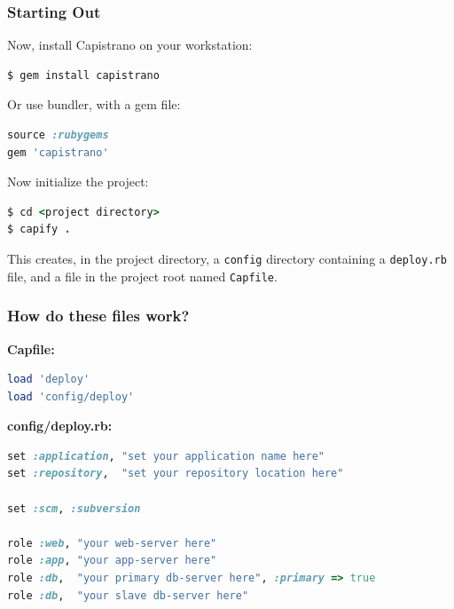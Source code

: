 \documentclass[t,handout]{beamer}
\begin{document}
\begin{frame}[fragile]
\frametitle{Starting Out}
Now, install Capistrano on your workstation:\\
\begin{lstlisting}[frame=none,language=Ruby,basicstyle=\scriptsize\ttfamily\color{black},]
$ gem install capistrano
\end{lstlisting}
Or use bundler, with a gem file:
\begin{lstlisting}[frame=none,language=Ruby,basicstyle=\scriptsize\ttfamily\color{black},]
source :rubygems
gem 'capistrano'
\end{lstlisting}
Now initialize the project:
\begin{lstlisting}[frame=none,language=Ruby,basicstyle=\scriptsize\ttfamily\color{black},]
$ cd <project directory>
$ capify .
\end{lstlisting}
This creates, in the project directory, a {\small\tt config} directory containing a {\small\tt deploy.rb} file, and a file in the project root named {\small\tt Capfile}.
\end{frame}

\begin{frame}[fragile]
\frametitle{How do these files work?}
{\bf Capfile:}\\
\begin{lstlisting}[frame=none,language=Ruby,basicstyle=\scriptsize\ttfamily\color{black},]
load 'deploy'
load 'config/deploy'
\end{lstlisting}
{\bf config/deploy.rb:}
\begin{lstlisting}[frame=none,language=Ruby,basicstyle=\scriptsize\ttfamily\color{black},]
set :application, "set your application name here"
set :repository,  "set your repository location here"

set :scm, :subversion

role :web, "your web-server here"
role :app, "your app-server here"
role :db,  "your primary db-server here", :primary => true 
role :db,  "your slave db-server here"
\end{lstlisting}
\end{frame}
\end{document}
